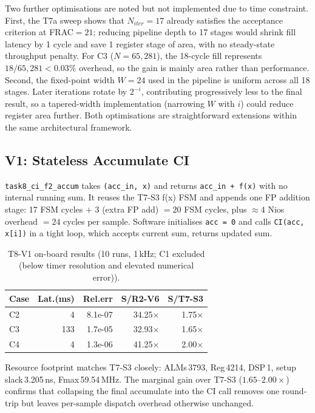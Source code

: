 \documentclass[a4paper,10pt,twocolumn]{article}
\begin{document}
Two further optimisations are noted but not implemented due to time constraint. First, the T7a sweep shows that $N_{iter}=17$ already satisfies the acceptance criterion at FRAC$=21$; reducing pipeline depth to 17 stages would shrink fill latency by 1 cycle and save 1 register stage of area, with no steady-state throughput penalty. For C3 ($N=65{,}281$), the 18-cycle fill represents $18/65{,}281 < 0.03\%$ overhead, so the gain is mainly area rather than performance. Second, the fixed-point width $W=24$ used in the pipeline is uniform across all 18 stages. Later iterations rotate by $2^{-i}$, contributing progressively less to the final result, so a tapered-width implementation (narrowing $W$ with $i$) could reduce register area further. Both optimisations are straightforward extensions within the same architectural framework.

\subsection{V1: Stateless Accumulate CI}
\texttt{task8\_ci\_f2\_accum} takes \texttt{(acc\_in,\,x)} and returns \texttt{acc\_in\,+\,f(x)} with no internal running sum. It reuses the T7-S3 f(x) FSM and appends one FP addition stage: 17 FSM cycles $+$ 3 (extra FP add) $= 20$ FSM cycles, plus ${\approx}4$ Nios overhead $= 24$ cycles per sample. Software initialises \texttt{acc\,=\,0} and calls \texttt{CI(acc,\,x[i])} in a tight loop, which accepts current sum, returns updated sum.

\begin{table}[H]
\centering
\caption{T8-V1 on-board results (10 runs, 1\,kHz; C1 excluded (below timer resolution and elevated numerical error)).}
\label{tab:t8v1_results}
\footnotesize
\setlength{\tabcolsep}{2.4pt}
\begin{tabular}{lrrrr}
\toprule
Case & Lat.(ms) & Rel.err & S/R2-V6 & S/T7-S3 \\
\midrule
C2 & 4 & 8.1e-07 & 34.25$\times$ & 1.75$\times$ \\
C3 & 133 & 1.7e-05 & 32.93$\times$ & 1.65$\times$ \\
C4 & 4 & 1.3e-06 & 41.25$\times$ & 2.00$\times$ \\
\bottomrule
\end{tabular}
\end{table}

Resource footprint matches T7-S3 closely: ALMs\,3793, Reg\,4214, DSP\,1, setup slack\,3.205\,ns, Fmax\,59.54\,MHz. The marginal gain over T7-S3 ($1.65\text{--}2.00\times$) confirms that collapsing the final accumulate into the CI call removes one round-trip but leaves per-sample dispatch overhead otherwise unchanged.
\end{document}

